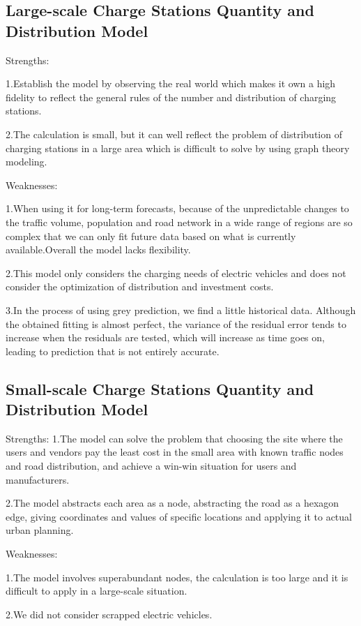\documentclass{mcmthesis}
\begin{document}
	\subsection{Large-scale Charge Stations Quantity and Distribution Model}
	Strengths: \par
	1.Establish the model by observing the real world which makes it own a high fidelity to reflect the general rules of the number and distribution of charging stations.\par
	2.The calculation is small, but it can well reflect the problem of distribution of charging stations in a large area which is difficult to solve by using graph theory modeling.\par
	Weaknesses:\par
	1.When using it for long-term forecasts, because of the unpredictable changes to the traffic volume, population and road network in a wide range of regions are so complex that we can only fit future data based on what is currently available.Overall the model lacks flexibility.\par
	2.This model only considers the charging needs of electric vehicles and does not consider the optimization of distribution and investment costs.\par
	3.In the process of using grey prediction, we find a little historical data. Although the obtained fitting is almost perfect, the variance of the residual error tends to increase when the residuals are tested, which will increase as time goes on, leading to prediction that is not entirely accurate.
	\subsection{Small-scale Charge Stations Quantity and Distribution Model}
	Strengths:
	1.The model can solve the problem that choosing the site where the users and vendors pay the least cost in the small area with known traffic nodes and road distribution, and achieve a win-win situation for users and manufacturers.
	\par
	2.The model abstracts each area as a node, abstracting the road as a hexagon edge, giving coordinates and values ​​of specific locations and applying it to actual urban planning.
	\par
	Weaknesses:
	\par
	1.The model involves superabundant nodes, the calculation is too large and it is difficult to apply in a large-scale situation.
	\par
	2.We did not consider scrapped electric vehicles.
	
\end{document}
